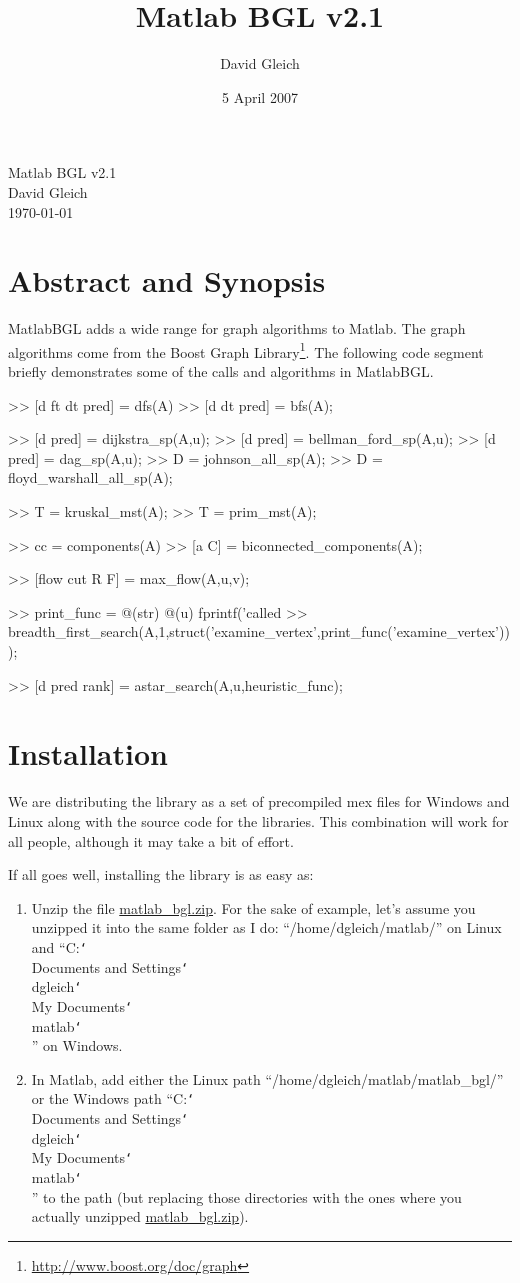 \documentclass[12pt]{article}
\author{David Gleich}
\title{Matlab BGL v2.1}
\date{5 April 2007}
\newcommand{\mypath}[1]{{\ttfamily \small #1}}
\DeclareRobustCommand\cs[1]{\texttt{\char`\\#1}}
\begin{document}
{
\setlength{\parskip}{0pt}
\begin{center}
{\Large Matlab BGL v2.1}\\
David Gleich\\
\today
\end{center}
}
\section*{Abstract and Synopsis}

MatlabBGL adds a wide range for graph algorithms to Matlab.  The graph algorithms come from the Boost Graph Library\footnote{\url{http://www.boost.org/doc/graph}}.  The following code segment briefly demonstrates some of the calls and algorithms in MatlabBGL.

\bigskip

\begin{mcode}
>> [d ft dt pred] = dfs(A)
>> [d dt pred] = bfs(A);

>> [d pred] = dijkstra_sp(A,u);
>> [d pred] = bellman_ford_sp(A,u);
>> [d pred] = dag_sp(A,u);
>> D = johnson_all_sp(A);
>> D = floyd_warshall_all_sp(A);

>> T = kruskal_mst(A);
>> T = prim_mst(A);

>> cc = components(A)  
>> [a C] = biconnected_components(A);

>> [flow cut R F] = max_flow(A,u,v);

>> print_func = @(str) @(u) fprintf('called %
>> breadth_first_search(A,1,struct('examine_vertex',print_func('examine_vertex')));

>> [d pred rank] = astar_search(A,u,heuristic_func);
\end{mcode}

\newpage
{
\setlength{\parskip}{0pt}
\tableofcontents
}
\newpage

\section{Installation}
We are distributing the library as a set of precompiled mex files for Windows and Linux along with the source code for the libraries.  This combination will work for all people, although it may take a bit of effort.

If all goes well, installing the library is as easy as:
\begin{enumerate}
\item	Unzip the file \url{matlab_bgl.zip}.  For the sake of example, let's assume you unzipped it into the same folder as I do: ``\mypath{/home/dgleich/matlab/}'' on Linux and ``\mypath{C:\cs{}Documents and Settings\cs{}dgleich\cs{}My Documents\cs{}matlab\cs{}}'' on Windows.
\item	In Matlab, add either the Linux path ``\mypath{/home/dgleich/matlab/matlab\_bgl/}'' or the Windows path ``\mypath{C:\cs{}Documents and Settings\cs{}dgleich\cs{}My Documents\cs{}matlab\cs{}}'' to the path (but replacing those directories with the ones where you actually unzipped \url{matlab_bgl.zip}).
\end{enumerate}
\end{document}
